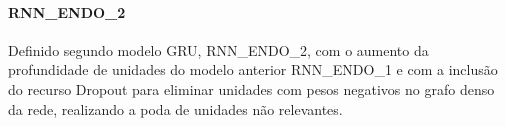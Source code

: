 \documentclass[	12pt, Times, openright, twoside, a4paper, english, brazil]{abntex2}
\begin{document}
             \paragraph{RNN\_ENDO\_2}
                Definido segundo modelo GRU, RNN\_ENDO\_2, com o aumento da profundidade de unidades do modelo anterior RNN\_ENDO\_1 e com a inclusão do recurso Dropout para eliminar unidades com pesos negativos no grafo denso da rede, realizando a poda de unidades não relevantes.
                \begin{figure}[H]
                \end{figure}
\end{document}
